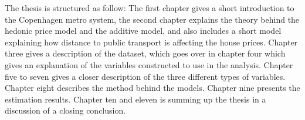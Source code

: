 The thesis is structured as follow: The first chapter gives a short
introduction to the Copenhagen metro system, the second chapter explains the 
theory behind the hedonic price model and the additive model, and also includes
a short model explaining how distance to public transport is affecting the 
house prices. Chapter three gives a description of the dataset, which goes over
in chapter four which gives an explanation of the variables constructed to use 
in the analysis. Chapter five to seven gives a closer description of the three 
different types of variables. Chapter eight describes the method behind the 
models. Chapter nine presents the estimation results. Chapter ten and eleven 
is 
summing up the thesis in a discussion of a closing conclusion. 

